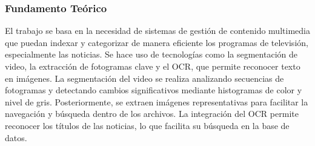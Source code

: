 \subsubsection{Fundamento Teórico}

El trabajo se basa en la necesidad de sistemas de gestión de contenido multimedia que puedan indexar y categorizar de manera eficiente los programas de televisión, especialmente las noticias. Se hace uso de tecnologías como la segmentación de video, la extracción de fotogramas clave y el OCR, que permite reconocer texto en imágenes. La segmentación del video se realiza analizando secuencias de fotogramas y detectando cambios significativos mediante histogramas de color y nivel de gris. Posteriormente, se extraen imágenes representativas para facilitar la navegación y búsqueda dentro de los archivos. La integración del OCR permite reconocer los títulos de las noticias, lo que facilita su búsqueda en la base de datos.

